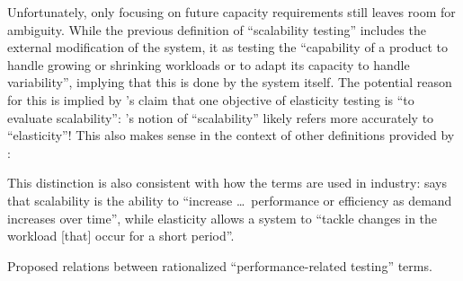 Unfortunately, only focusing on future capacity requirements still leaves room
for ambiguity. While the previous definition of ``scalability testing'' includes
the external modification of the system, \citet{ISO_IEC2023a}
 it as testing the ``capability of a product to
handle growing or shrinking workloads or to adapt its capacity to handle
variability'', implying that this is done by the system itself. The potential
reason for this is implied by \citet[p.~5-9]{SWEBOK2024}'s claim that one
objective of elasticity testing is ``to evaluate scalability'':
\citep{ISO_IEC2023a}'s notion of ``scalability''
likely refers more accurately to ``elasticity''! This also makes sense in the
context of other definitions provided by \citet{SWEBOK2024}:
This distinction is also consistent with how the terms are used in industry:
\citet{Pandey2023} says that scalability is the ability to
``increase \dots\ performance or efficiency as demand increases over time'',
while elasticity allows a system to ``tackle changes in the workload [that]
occur for a short period''.

\scalGraphs{}

\begin{paperFigure}
    \centering
    \performanceGraph{}
    \caption{Proposed relations between rationalized ``performance-related testing'' terms.}
    \label{fig:perf-graph}
\end{paperFigure}

